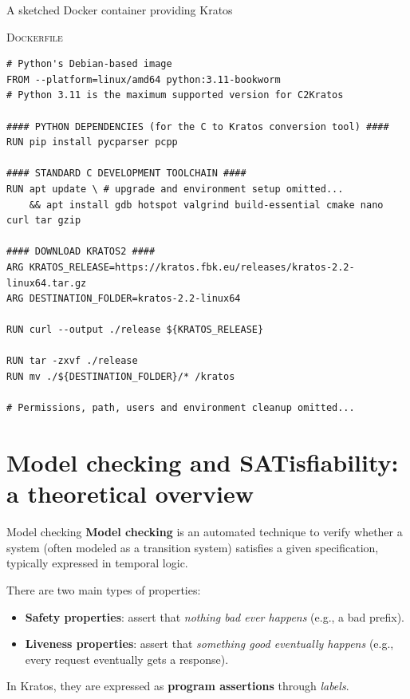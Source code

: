 \documentclass[aspectratio=1610,10.5pt]{beamer} %
\begin{document}
\begin{frame}[fragile]{A sketched Docker container providing Kratos} %
    \begin{block}{\textsc{Dockerfile}}
            \begin{verbatim}
# Python's Debian-based image
FROM --platform=linux/amd64 python:3.11-bookworm
# Python 3.11 is the maximum supported version for C2Kratos

#### PYTHON DEPENDENCIES (for the C to Kratos conversion tool) ####
RUN pip install pycparser pcpp

#### STANDARD C DEVELOPMENT TOOLCHAIN ####
RUN apt update \ # upgrade and environment setup omitted...
    && apt install gdb hotspot valgrind build-essential cmake nano curl tar gzip

#### DOWNLOAD KRATOS2 ####
ARG KRATOS_RELEASE=https://kratos.fbk.eu/releases/kratos-2.2-linux64.tar.gz
ARG DESTINATION_FOLDER=kratos-2.2-linux64

RUN curl --output ./release ${KRATOS_RELEASE}

RUN tar -zxvf ./release
RUN mv ./${DESTINATION_FOLDER}/* /kratos

# Permissions, path, users and environment cleanup omitted...
            \end{verbatim}
    \end{block}
\end{frame}

\section{Model checking and SATisfiability: a theoretical overview}
\begin{frame}{Model checking}
    \textbf{Model checking} is an automated technique to verify whether a system (often modeled as a transition system) satisfies a given specification, typically expressed in temporal logic.

    \bigskip

    There are two main types of properties:
    \begin{itemize}
        \item \textbf{Safety properties}: assert that \textit{nothing bad ever happens} (e.g., a bad prefix).
        \item \textbf{Liveness properties}: assert that \textit{something good eventually happens} (e.g., every request eventually gets a response).
    \end{itemize}

    \medskip

    In Kratos, they are expressed as \textbf{program assertions} through \textit{labels}.
\end{frame}
\end{document}
